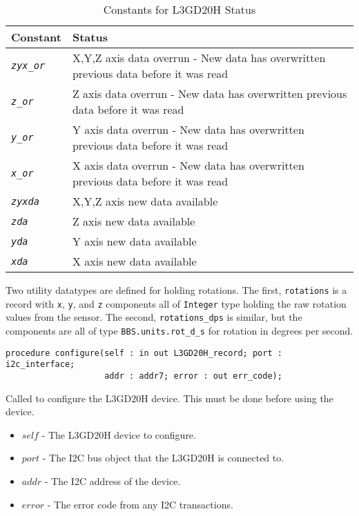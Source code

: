 \documentclass[10pt, openany]{book}
\newcommand{\constant}[1]{\emph{\texttt{#1}}}
\newcommand{\datatype}[1]{\texttt{#1}}
\begin{document}
\begin{table}[!h]
\begin{center}
  \begin{tabular}{l|l}
    Constant & Status \\
    \hline
    \constant{zyx\_or} & X,Y,Z axis data overrun - New data has overwritten previous data before it was read \\
    \constant{z\_or} & Z axis data overrun - New data has overwritten previous data before it was read \\
    \constant{y\_or} & Y axis data overrun - New data has overwritten previous data before it was read \\
    \constant{x\_or} & X axis data overrun - New data has overwritten previous data before it was read \\
    \constant{zyxda} & X,Y,Z axis new data available \\
    \constant{zda} & Z axis new data available \\
    \constant{yda} & Y axis new data available \\
    \constant{xda} & X axis new data available \\
  \end{tabular}
  \caption{Constants for L3GD20H Status}
  \label{tbl:L3GD20HStat}
\end{center}
\end{table}

Two utility datatypes are defined for holding rotations.  The first,  \datatype{rotations} is a record with \datatype{x}, \datatype{y}, and \datatype{z} components all of \datatype{Integer} type holding the raw rotation values from the sensor.  The second, \datatype{rotations\_dps} is similar, but the components are all of type \datatype{BBS.units.rot\_d\_s} for rotation in degrees per second.

\begin{lstlisting}
procedure configure(self : in out L3GD20H_record; port : i2c_interface;
                    addr : addr7; error : out err_code);
\end{lstlisting}
Called to configure the L3GD20H device.  This must be done before using the device.
\begin{itemize}
  \item $self$ - The L3GD20H device to configure.
  \item $port$ - The I2C bus object that the L3GD20H is connected to.
  \item $addr$ - The I2C address of the device.
  \item $error$ - The error code from any I2C transactions.
\end{itemize}
\end{document}
